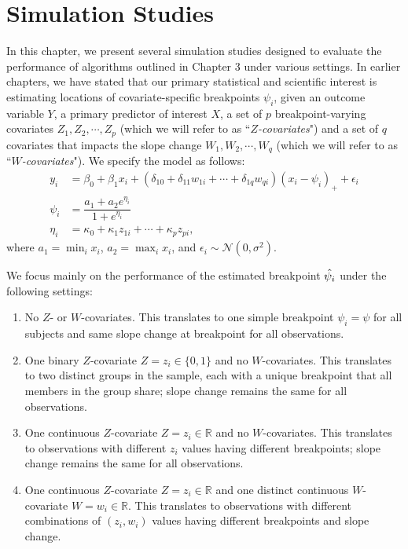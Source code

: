 \documentclass [12pt, proquest] {uwthesis}[2016/11/22]
\begin{document}
 
\chapter{Simulation Studies}

In this chapter, we present several simulation studies designed to evaluate the performance of algorithms outlined in Chapter 3 under various settings. In earlier chapters, we have stated that our primary statistical and scientific interest is estimating locations of covariate-specific breakpoints $\psi_i$, given an outcome variable $Y$, a primary predictor of interest $X$, a set of $p$ breakpoint-varying covariates $Z_1, Z_2, \cdots, Z_p$ (which we will refer to as ``\emph{$Z$-covariates}") and a set of $q$ covariates that impacts the slope change $W_1, W_2, \cdots, W_q$ (which we will refer to as ``\emph{$W$-covariates}"). We specify the model as follows:
\begin{align}
   y_i &= \beta_0 + \beta_1 x_i + (\delta_{10} + \delta_{11} w_{1i} + \cdots + \delta_{1q} w_{qi}) (x_i - \psi_i)_+ + \epsilon_i \\
    \psi_i &= \dfrac{a_1 + a_2 e^{\eta_i}}{1 + e^{\eta_i}} \\
    \eta_i &= \kappa_0 + \kappa_1 z_{1i} + \cdots + \kappa_p z_{pi},
\end{align}
where $a_1 = \min_i x_i$, $a_2 = \max_i x_i$, and $\epsilon_i \sim \mathcal{N}(0, \sigma^2)$.

We focus mainly on the performance of the estimated breakpoint $\Hat{\psi_i}$ under the following settings:
\begin{enumerate}
    \item No $Z$- or $W$-covariates. This translates to one simple breakpoint $\psi_i = \psi$ for all subjects and same slope change at breakpoint for all observations.
    \item One binary $Z$-covariate $Z = z_i \in \{0, 1\}$ and no $W$-covariates. This translates to two distinct groups in the sample, each with a unique breakpoint that all members in the group share; slope change remains the same for all observations.
    \item One continuous $Z$-covariate $Z = z_i \in \mathbb{R}$ and no $W$-covariates. This translates to observations with different $z_i$ values having different breakpoints; slope change remains the same for all observations.
    \item One continuous $Z$-covariate $Z = z_i \in \mathbb{R}$ and one distinct continuous $W$-covariate $W = w_i \in \mathbb{R}$. This translates to observations with different combinations of $(z_i, w_i)$ values having different breakpoints and slope change.
\end{enumerate}
\end{document}
